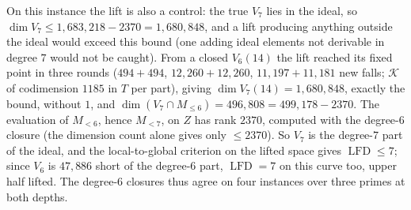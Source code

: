 \documentclass[11pt]{article}
\theoremstyle{definition}\newtheorem{definition}[theorem]{Definition}
\theoremstyle{remark}\newtheorem{remark}[theorem]{Remark}
\newcommand{\lfd}{\operatorname{LFD}}
\begin{document}
On this instance the lift is also a control: the true $V_7$ lies in the ideal,
so $\dim V_7\le1{,}683{,}218-2370=1{,}680{,}848$, and a lift producing anything
outside the ideal would exceed this bound (one adding ideal elements not
derivable in degree $7$ would not be caught). From a closed $V_6(14)$ the lift
reached its fixed point in three rounds ($494+494$, $12{,}260+12{,}260$,
$11{,}197+11{,}181$ new falls; $\mathcal K$ of codimension $1185$ in $T$ per
part), giving $\dim V_7(14)=1{,}680{,}848$, exactly the bound, without $1$, and
$\dim(V_7\cap M_{\le6})=496{,}808=499{,}178-2370$. The evaluation of $M_{<6}$,
hence $M_{<7}$, on $Z$ has rank $2370$, computed with the degree-$6$ closure
(the dimension count alone gives only $\le2370$). So $V_7$ is the degree-$7$
part of the ideal, and the local-to-global criterion on the lifted space gives
$\lfd\le7$; since $V_6$ is $47{,}886$ short of the degree-$6$ part, $\lfd=7$ on
this curve too, upper half lifted. The degree-$6$ closures thus agree on four
instances over three primes at both depths.
\end{document}
